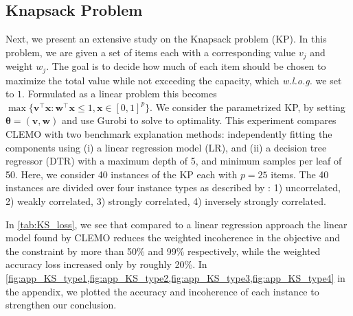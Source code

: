 \documentclass{article}
\theoremstyle{plain}
\theoremstyle{definition}
\theoremstyle{remark}
\begin{document}
\subsection{Knapsack Problem}
Next, we present an extensive study on the Knapsack problem (KP). In this problem, we are given a set of items each with a corresponding value $v_j$ and weight $w_j$. The goal is to decide how much of each item should be chosen to maximize the total value while not exceeding the capacity, which \textit{w.l.o.g.} we set to $1$. Formulated as a linear problem this becomes $\max \{ \bm{v}^\intercal\bm{x}:\bm{w}^\intercal\bm{x}\leq 1, \bm{x}\in [0,1]^p\}$.
We consider the parametrized KP, by setting $\bm{\theta}=(\bm{v},\bm{w})$ and use Gurobi \cite{gurobi} to solve to optimality. This experiment compares CLEMO with two benchmark explanation methods: independently fitting the components using (i) a linear regression model (LR), and (ii) a decision tree regressor (DTR) with a maximum depth of 5, and minimum samples per leaf of 50. Here, we consider 40 instances of the KP each with $p=25$ items. The 40 instances are divided over four instance types as described by \citep{pisinger_where_2005}: 1) uncorrelated, 2) weakly correlated, 3) strongly correlated, 4) inversely strongly correlated.

In \cref{tab:KS_loss}, we see that compared to a linear regression approach the linear model found by CLEMO reduces the weighted incoherence in the objective and the constraint by more than 50\% and 99\% respectively, while the weighted accuracy loss increased only by roughly 20\%. In \cref{fig:app_KS_type1,fig:app_KS_type2,fig:app_KS_type3,fig:app_KS_type4} in the appendix, we plotted the accuracy and incoherence of each instance to strengthen our conclusion.
\end{document}
